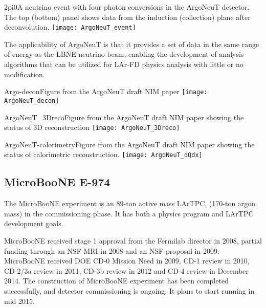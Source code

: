 \begin{cdrfigure}{2pi0}{A neutrino event with four photon conversions in the ArgoNeuT detector. The top (bottom) panel shows data from the induction (collection) plane after deconvolution.}
\texttt{[image: ArgoNeuT\_event]}
\end{cdrfigure}


The applicability of ArgoNeuT is that it provides a set of data in the same range of energy as the LBNE neutrino beam, enabling the development of analysis algorithms that can be utilized for LAr-FD physics analysis with little or no modification.


\begin{cdrfigure}{Argo-decon}{Figure from the ArgoNeuT draft NIM paper}
\texttt{[image: ArgoNeuT\_decon]}
\end{cdrfigure} %

\begin{cdrfigure}{ArgoNeuT_3Dreco}{Figure from the ArgoNeuT draft NIM paper showing the status of 3D reconstruction}
\texttt{[image: ArgoNeuT\_3Dreco]}
\end{cdrfigure}%

\begin{cdrfigure}{ArgoNeuT-calorimetry}{Figure from the ArgoNeuT draft NIM paper showing the status of calorimetric reconstruction.}
\texttt{[image: ArgoNeuT\_dQdx]}
\end{cdrfigure}%

\subsection {MicroBooNE E-974}

The MicroBooNE experiment is an 89-ton active mass LArTPC, (170-ton argon mass) in the commissioning phase.  It has both a physics program and LArTPC development goals.  

MicroBooNE received stage 1 approval from the Fermilab director in 2008, partial funding through an NSF MRI in 2008 and an NSF proposal in 2009.  MicroBooNE received DOE CD-0 Mission Need in 2009, CD-1 review in 2010, CD-2/3a review in 2011, CD-3b review in 2012 and CD-4 review in December 2014. The construction of MicroBooNE experiment has been completed successfully, and detector commissioning is ongoing. It plans to start running in mid 2015. 

